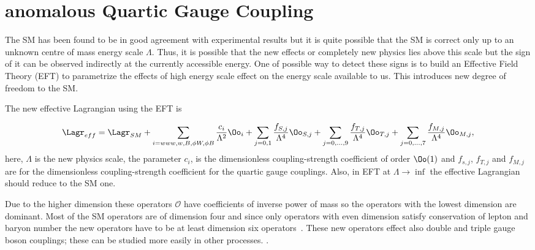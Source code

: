 % 


\section{anomalous Quartic Gauge Coupling} %
\label{sec:anomalous_quartic_gauge_coupling}
The SM has been found to be in good agreement with experimental results but it is quite possible that the SM is correct only up to an unknown centre of mass energy scale $\Lambda$.
Thus, it is possible that the new effects or completely new physics lies above this scale but the sign of it can be observed indirectly at the currently accessible energy.
One of possible way to detect these signs is to build an Effective Field Theory (EFT) to parametrize the effects of high energy scale effect on the energy scale available to us. This introduces new degree of freedom to the SM.

The new effective Lagrangian using the EFT is

\begin{equation}
    \Lagr_{eff} = \Lagr_{SM} + \sum_{i=www,w,B, \phi W, \phi B} \frac{c_i}{\Lambda^2} {\Oo}_i + \sum_{j=0,1}\frac{f_{S,j}}{\Lambda^4} \Oo_{S,j} + \sum_{j=0,...,9}\frac{f_{T,j}}{\Lambda^4} \Oo_{T,j}  + \sum_{j=0,...,7}\frac{f_{M,j}}{\Lambda^4} \Oo_{M,j} ,
\end{equation}
here, $\Lambda$ is the new physics scale, the parameter $c_i$, is the dimensionless coupling-strength coefficient of order $\Oo(1)$ and $f_{s,j}$, $f_{T,j}$ and $f_{M,j}$ are for the dimensionless coupling-strength coefficient for the quartic gauge couplings. Also, in EFT at $\Lambda \rightarrow \inf$ the effective Lagrangian should reduce to the SM one.

Due to the higher dimension these operators $\mathcal{O}$ have coefficients of inverse power of mass so the operators with the lowest dimension are dominant. Most of the SM operators are of dimension four and since only operators with even dimension satisfy conservation of lepton and baryon number the new operators have to be at least dimension six operators~\cite{Degrande2013a}. 
These new operators effect also double and triple gauge boson couplings; these can be studied more easily in other processes. .

